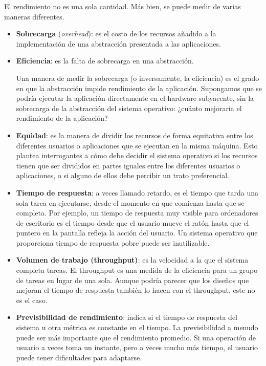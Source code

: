 \documentclass[10pt]{book}
\begin{document}
El rendimiento no es una sola cantidad. Más bien, se puede medir de varias maneras diferentes. 
\begin{itemize}
\item \textbf{Sobrecarga} (\textit{overhead}): es el costo de los recursos añadido a la implementación de una abstracción presentada a las aplicaciones. 
\item \textbf{Eficiencia}: es la falta de sobrecarga en una abstracción.

Una manera de medir la sobrecarga (o inversamente, la eficiencia) es el grado en que la abstracción impide rendimiento de la aplicación. Supongamos que se podría ejecutar la aplicación directamente en el hardware subyacente, sin la sobrecarga de la abstracción del sistema operativo: ¿cuánto mejoraría el rendimiento de la aplicación?

\item \textbf{Equidad}: es la manera de dividir los recursos de forma equitativa entre los diferentes usuarios o aplicaciones que se ejecutan en la misma máquina. Esto plantea interrogantes a cómo debe decidir el sistema operativo si los recursos tienen que ser divididos en partes iguales entre los diferentes usuarios o aplicaciones, o si alguno de ellos debe percibir un trato preferencial.

\item \textbf{Tiempo de respuesta}: a veces llamado retardo, es el tiempo que tarda una sola tarea en ejecutarse, desde el momento en que comienza hasta que se completa. Por ejemplo, un tiempo de respuesta muy visible para ordenadores de escritorio es el tiempo desde que el usuario mueve el ratón hasta que el puntero en la pantalla refleja la acción del usuario. Un sistema operativo que proporciona tiempo de respuesta pobre puede ser inutilizable.

\item \textbf{Volumen de trabajo (throughput)}: es la velocidad a la que el sistema completa tareas. El throughput es una medida de la eficiencia para un grupo de tareas en lugar de una sola. Aunque podría parecer que los diseños que mejoran el tiempo de respuesta también lo hacen con el throughput, este no es el caso.

\item \textbf{Previsibilidad de rendimiento}: indica si el tiempo de respuesta del sistema u otra métrica es constante en el tiempo. La previsibilidad a menudo puede ser más importante que el rendimiento promedio. Si una operación de usuario a veces toma un instante, pero a veces mucho más tiempo, el usuario puede tener dificultades para adaptarse.
\end{itemize}
\end{document}
